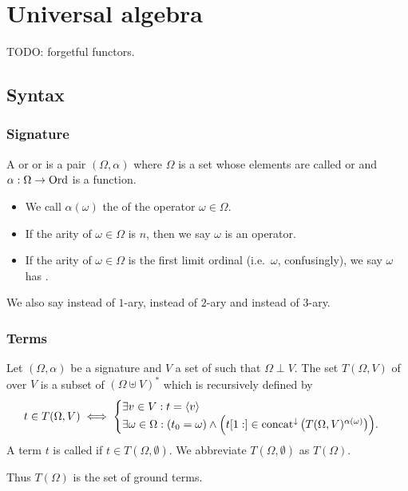 \chapter{Universal algebra}
TODO: forgetful functors.

\section{Syntax}
\subsection{Signature}
\begin{definition}
A  or  or  is a pair $(\Omega, \alpha)$ where $\Omega$ is a set whose elements are called  or  and $\alpha: \Omega \to \operatorname{Ord}$ is a function.
\begin{itemize}
    \item We call $\alpha(\omega)$ the  of the operator $\omega\in\Omega$.
    \item If the arity of $\omega\in\Omega$ is $n$, then we say $\omega$ is an  operator.
    \item If the arity of $\omega\in\Omega$ is the first limit ordinal (i.e.\ $\omega$, confusingly), we say $\omega$ has .
\end{itemize}
\end{definition}
We also say  instead of $1$-ary,  instead of $2$-ary and  instead of $3$-ary.

\subsection{Terms}
\begin{definition}
Let $(\Omega, \alpha)$ be a signature and $V$ a set of  such that $\Omega\perp V$. The set $T(\Omega, V)$ of  over $V$ is a subset of $(\Omega\uplus V)^*$ which is recursively defined by
\[ t\in T(\Omega, V) \iff \begin{cases}
\exists v\in V: t = \left\langle v \right\rangle \\
\exists \omega\in \Omega: (t_0 = \omega) \land \Big(t[1:] \in \operatorname{concat}^{\downarrow}\big(T(\Omega, V)^{\alpha(\omega)}\big) \Big).
\end{cases} \]
A term $t$ is called  if $t\in T(\Omega, \emptyset)$. We abbreviate $T(\Omega, \emptyset)$ as $T(\Omega)$.
\end{definition}
Thus $T(\Omega)$ is the set of ground terms.

